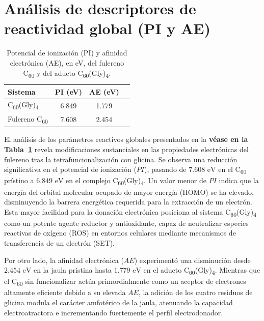 \section{Análisis de descriptores de reactividad global (PI y AE)}
\begin{table}[H]
    \centering
    \caption{Potencial de ionización (PI) y afinidad electrónica (AE), en eV, del fulereno C\textsubscript{60} y del aducto C\textsubscript{60}(Gly)\textsubscript{4}.}
    \label{tab:energias-referencia}
    \renewcommand{\arraystretch}{1.15}
    \begin{tabular}{lccc}
        \toprule
        \textbf{Sistema} & \textbf{PI (eV)} & \textbf{AE (eV)}\\
        \midrule
         C\textsubscript{60}(Gly)\textsubscript{4} & 6.849
 & 1.779 \\
        Fulereno  C\textsubscript{60} & 7.608
 & 2.454 \\
        \bottomrule
    \end{tabular}
\end{table}

El análisis de los parámetros reactivos globales presentados en la  \textbf{\textbf{véase en la Tabla~\ref{tab:energias-referencia}}} revela modificaciones sustanciales en las propiedades electrónicas del fulereno tras la tetrafuncionalización con glicina. Se observa una reducción significativa en el potencial de ionización ($PI$), pasando de $7.608\text{ eV}$ en el C\textsubscript{60} prístino a $6.849\text{ eV}$ en el complejo C\textsubscript{60}(Gly)\textsubscript{4}. Un valor menor de $PI$ indica que la energía del orbital molecular ocupado de mayor energía (HOMO) se ha elevado, disminuyendo la barrera energética requerida para la extracción de un electrón. Esta mayor facilidad para la donación electrónica posiciona al sistema C\textsubscript{60}(Gly)\textsubscript{4} como un potente agente reductor y antioxidante, capaz de neutralizar especies reactivas de oxígeno (ROS) en entornos celulares mediante mecanismos de transferencia de un electrón (SET).

Por otro lado, la afinidad electrónica ($AE$) experimentó una disminución desde $2.454\text{ eV}$ en la jaula prístina hasta $1.779\text{ eV}$ en el aducto C\textsubscript{60}(Gly)\textsubscript{4}. Mientras que el C\textsubscript{60} sin funcionalizar actúa primordialmente como un aceptor de electrones altamente eficiente debido a su elevada $AE$, la adición de los cuatro residuos de glicina modula el carácter amfotérico de la jaula, atenuando la capacidad electroatractora e incrementando fuertemente el perfil electrodonador.

